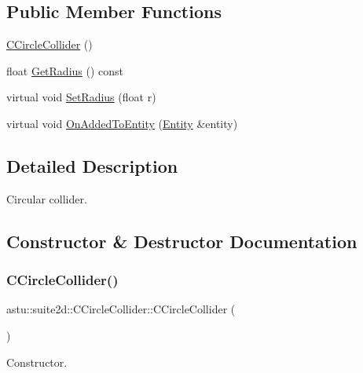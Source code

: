 \subsection*{Public Member Functions}
\begin{DoxyCompactItemize}
\item 
\hyperlink{classastu_1_1suite2d_1_1CCircleCollider_a724afec3b0f2b48e93bd0844bae5c951}{C\+Circle\+Collider} ()
\item 
float \hyperlink{classastu_1_1suite2d_1_1CCircleCollider_a7ec8a6c889a1502e9c650be905cd7aea}{Get\+Radius} () const
\item 
virtual void \hyperlink{classastu_1_1suite2d_1_1CCircleCollider_a0f064219591b23beace315bb58f26c78}{Set\+Radius} (float r)
\item 
virtual void \hyperlink{classastu_1_1suite2d_1_1CCircleCollider_aa77499480ca5f7d49f6331986b675a46}{On\+Added\+To\+Entity} (\hyperlink{classastu_1_1Entity}{Entity} \&entity)
\end{DoxyCompactItemize}


\subsection{Detailed Description}
Circular collider. 

\subsection{Constructor \& Destructor Documentation}
\mbox{\label{classastu_1_1suite2d_1_1CCircleCollider_a724afec3b0f2b48e93bd0844bae5c951}} 
\subsubsection{\texorpdfstring{C\+Circle\+Collider()}{CCircleCollider()}}
{\footnotesize\ttfamily astu\+::suite2d\+::\+C\+Circle\+Collider\+::\+C\+Circle\+Collider (\begin{DoxyParamCaption}{ }\end{DoxyParamCaption})\hspace{0.3cm}{\ttfamily [inline]}}

Constructor. 

